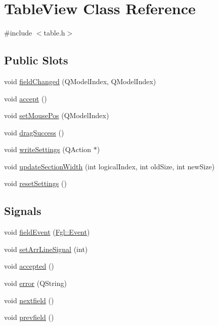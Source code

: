 \hypertarget{classTableView}{
\section{TableView Class Reference}
\label{classTableView}
}


{\ttfamily \#include $<$table.h$>$}

\subsection*{Public Slots}
\begin{DoxyCompactItemize}
\item 
void \hyperlink{classTableView_a4c5b64ca3ffb2289d6b9030942cfbfd5}{fieldChanged} (QModelIndex, QModelIndex)
\item 
void \hyperlink{classTableView_a4ae2229ec68bc96ada98844bc47434f5}{accept} ()
\item 
void \hyperlink{classTableView_ab31519c042431fa0e23f04b719156776}{setMousePos} (QModelIndex)
\item 
void \hyperlink{classTableView_ae24787bc253d6f181c13fc58bffd7ba2}{dragSuccess} ()
\item 
void \hyperlink{classTableView_a70c32ac02d45e8723f3521cf80f3862e}{writeSettings} (QAction $\ast$)
\item 
void \hyperlink{classTableView_a643a93fdbb136136598e30dc3b3ad5e4}{updateSectionWidth} (int logicalIndex, int oldSize, int newSize)
\item 
void \hyperlink{classTableView_af8a2f8a181aeb8d565fca8be2fe1437c}{resetSettings} ()
\end{DoxyCompactItemize}
\subsection*{Signals}
\begin{DoxyCompactItemize}
\item 
void \hyperlink{classTableView_aadaf88a599aa680ea0d6a3887ed8289d}{fieldEvent} (\hyperlink{structFgl_1_1Event}{Fgl::Event})
\item 
void \hyperlink{classTableView_a5f99090ec924b96b7f2b026c47f580e6}{setArrLineSignal} (int)
\item 
void \hyperlink{classTableView_ad4f6aa906c014bed4437f67817e990e0}{accepted} ()
\item 
void \hyperlink{classTableView_a2ae0fadd583c6d25c0c8759d2b01ba6a}{error} (QString)
\item 
void \hyperlink{classTableView_a305e99f446bebdec5735d14281e06de9}{nextfield} ()
\item 
void \hyperlink{classTableView_a7648f39aa6fe83ae729c874f5437dba6}{prevfield} ()
\end{DoxyCompactItemize}
